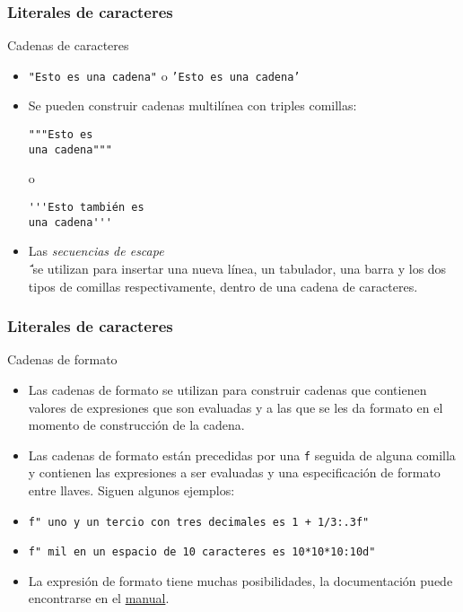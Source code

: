 \documentclass{beamer}
\begin{document}
\begin{frame}[fragile]
\frametitle{Literales de caracteres}
\begin{block}{Cadenas de caracteres}
\begin{itemize}
\item \texttt{"Esto es una cadena"} o \texttt{'Esto es una cadena'}
\item Se pueden construir cadenas multilínea con triples comillas:
\begin{verbatim}
"""Esto es
una cadena"""
\end{verbatim}
o 
\begin{verbatim}
'''Esto también es
una cadena'''
\end{verbatim}
\item Las {\em secuencias de escape} \texttt{\n \t \\ \' \"} se utilizan para insertar una nueva línea, un tabulador, una barra y los dos tipos de comillas respectivamente, dentro de una cadena de caracteres.
\end{itemize}
\end{block}

\end{frame}

\begin{frame}[fragile]
\frametitle{Literales de caracteres}
\begin{block}{Cadenas de formato}
\begin{itemize}
\item Las cadenas de formato se utilizan para construir cadenas que contienen valores de \alert{expresiones} que son evaluadas y a las que se les da formato en el momento de construcción de la cadena. 
\item Las cadenas de formato están precedidas por una {\tt f} seguida de alguna comilla y contienen las expresiones a ser evaluadas y una especificación de formato entre llaves. Siguen algunos ejemplos:
\item  \texttt{f" uno y un tercio con tres decimales es {1 + 1/3:.3f}"}
\item  \texttt{f" mil en un espacio de 10 caracteres es {10*10*10:10d}"}
\item La expresión de formato tiene muchas posibilidades, la documentación puede encontrarse en el \href{https://docs.python.org/3/library/string.html}{manual}.
\end{itemize}
\end{block}

\end{frame}
\end{document}
